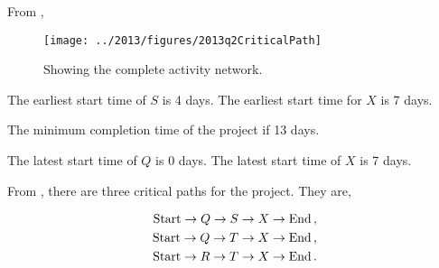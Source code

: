 %
%

\begin{subquestions}


\subquestion

From ,

\begin{figure}
	\begin{center}
		\texttt{[image: ../2013/figures/2013q2CriticalPath]}
		\caption{\label{2013:q2:fig:ActNet} Showing the complete activity network.}
	\end{center}
\end{figure}




\begin{subsubquestions}

\subsubquestion 

The earliest start time of $S$ is 4 days. The earliest start time for $X$ is 7 days.

\subsubquestion

The minimum completion time of the project if 13 days.

\subsubquestion

The latest start time of $Q$ is 0 days. The latest start time of $X$ is 7 days.

\subsubquestion

From , there are three critical paths for the project. They are,

\begin{align}
	\text{Start} \rightarrow Q \rightarrow S \rightarrow X \rightarrow \text{End}\,, \nonumber \\
	\text{Start} \rightarrow Q \rightarrow T \rightarrow X \rightarrow \text{End}\,, \nonumber \\
	\text{Start} \rightarrow R \rightarrow T \rightarrow X \rightarrow \text{End}\,.
\end{align}


\end{subsubquestions}
\end{subquestions}
